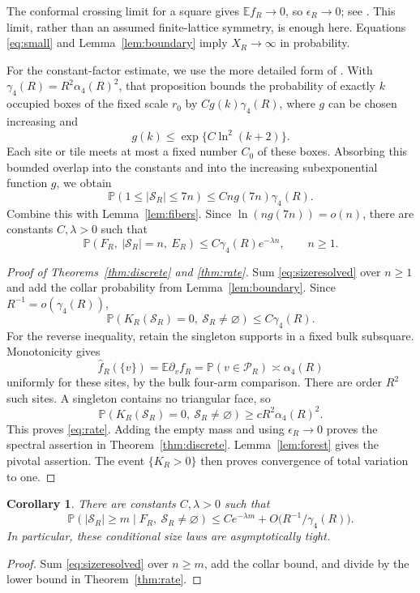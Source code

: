 \documentclass[11pt]{amsart}
\newtheorem{corollary}[theorem]{Corollary}
\theoremstyle{remark}
\newcommand{\Prob}{\mathbb P}
\newcommand{\E}{\mathbb E}
\newcommand{\cS}{\mathcal S}
\newcommand{\cP}{\mathcal P}
\begin{document}
The conformal crossing limit for a square gives $\E f_R\to0$, so $\epsilon_R\to0$; see \cite{Smirnov}. This limit, rather than an assumed finite-lattice symmetry, is enough here. Equations \eqref{eq:small} and Lemma~\ref{lem:boundary} imply $X_R\to\infty$ in probability.

For the constant-factor estimate, we use the more detailed form of \cite[Proposition~4.1]{GPS}. With $\gamma_4(R)=R^2\alpha_4(R)^2$, that proposition bounds the probability of exactly $k$ occupied boxes of the fixed scale $r_0$ by $C g(k)\gamma_4(R)$, where $g$ can be chosen increasing and
\[
 g(k)\le\exp\{C\ln^2(k+2)\}.
\]
Each site or tile meets at most a fixed number $C_0$ of these boxes. Absorbing this bounded overlap into the constants and into the increasing subexponential function $g$, we obtain
\begin{equation}\label{eq:gpssize}
 \Prob(1\le|\cS_R|\le7n)\le Cn g(7n)\gamma_4(R).
\end{equation}
Combine this with Lemma~\ref{lem:fibers}. Since $\ln(ng(7n))=o(n)$, there are constants $C,\lambda>0$ such that
\begin{equation}\label{eq:sizeresolved}
 \Prob(F_R,\ |\cS_R|=n,\ E_R)
 \le C\gamma_4(R)e^{-\lambda n},\qquad n\ge1.
\end{equation}

\begin{proof}[Proof of Theorems~\ref{thm:discrete} and \ref{thm:rate}]
Sum \eqref{eq:sizeresolved} over $n\ge1$ and add the collar probability from Lemma~\ref{lem:boundary}. Since $R^{-1}=o(\gamma_4(R))$,
\[
 \Prob(K_R(\cS_R)=0,\ \cS_R\ne\varnothing)\le C\gamma_4(R).
\]
For the reverse inequality, retain the singleton supports in a fixed bulk subsquare. Monotonicity gives
\[
 \widehat f_R(\{v\})=\E\partial_vf_R
 =\Prob(v\in\cP_R)\asymp\alpha_4(R)
\]
uniformly for these sites, by the bulk four-arm comparison. There are order $R^2$ such sites. A singleton contains no triangular face, so
\[
 \Prob(K_R(\cS_R)=0,\ \cS_R\ne\varnothing)
 \ge c R^2\alpha_4(R)^2.
\]
This proves \eqref{eq:rate}. Adding the empty mass and using $\epsilon_R\to0$ proves the spectral assertion in Theorem~\ref{thm:discrete}. Lemma~\ref{lem:forest} gives the pivotal assertion. The event $\{K_R>0\}$ then proves convergence of total variation to one.
\end{proof}

\begin{corollary}\label{cor:conditionalsize}
There are constants $C,\lambda>0$ such that
\[
 \Prob(|\cS_R|\ge m\mid F_R,\ \cS_R\ne\varnothing)
 \le C e^{-\lambda m}+O\bigl(R^{-1}/\gamma_4(R)\bigr).
\]
In particular, these conditional size laws are asymptotically tight.
\end{corollary}
\begin{proof}
Sum \eqref{eq:sizeresolved} over $n\ge m$, add the collar bound, and divide by the lower bound in Theorem~\ref{thm:rate}.
\end{proof}
\end{document}
